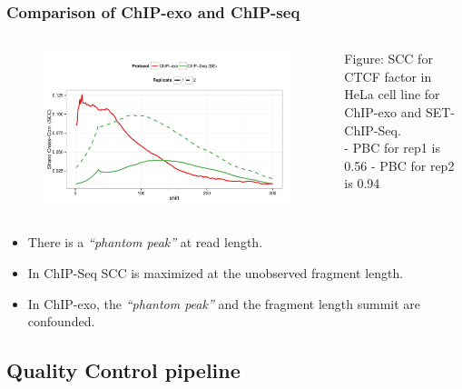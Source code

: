 \documentclass[compress,table,xcolor=dvipsnames]{beamer}\usepackage[]{graphicx}\usepackage[]{color}
\begin{document}
\begin{frame}[t]
  \frametitle{Comparison of ChIP-exo and ChIP-seq}  
\begin{columns}
\begin{figure}[H]
  \centering  
\includegraphics[width = .9\textwidth]{../figs/for_paper/scc_ctcf.pdf}
\end{figure}

  \begin{minipage}[c][.6\textheight][c]{\linewidth}
{\small
  {\color{RoyalBlue}Figure:} SCC for CTCF factor in HeLa cell line for
    ChIP-exo and SET-ChIP-Seq.\\
    - {\color{ForestGreen} PBC for rep1 is 0.56}
    - {\color{ForestGreen} PBC for rep2 is 0.94}
  }
\end{minipage}
\end{columns}

{\small
\begin{itemize}
\item There is a \emph{``phantom peak''} at read length.
\item In ChIP-Seq SCC is maximized at the unobserved fragment length.
\item In ChIP-exo, the \emph{``phantom peak''} and the fragment length
  summit are confounded.
\end{itemize}
}
\end{frame}

\subsection{Quality Control pipeline}
\end{document}

